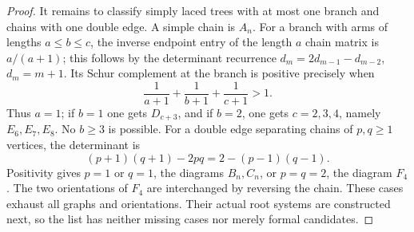 \begin{proof}
It remains to classify simply laced trees with at most
one branch and chains with one double edge.
A simple chain is \(A_n\).
For a branch with arms of lengths \(a\le b\le c\),
the inverse endpoint entry of the length \(a\) chain
matrix is \(a/(a+1)\); this follows by the determinant
recurrence \(d_m=2d_{m-1}-d_{m-2}\), \(d_m=m+1\).
Its Schur complement at the branch is positive precisely when
\[
 \frac1{a+1}+\frac1{b+1}+\frac1{c+1}>1.
\]
Thus \(a=1\); if \(b=1\) one gets \(D_{c+3}\), and if
\(b=2\), one gets \(c=2,3,4\), namely \(E_6,E_7,E_8\).
No \(b\ge3\) is possible.
For a double edge separating chains of \(p,q\ge1\) vertices,
the determinant is
\[
 (p+1)(q+1)-2pq=2-(p-1)(q-1).
\]
Positivity gives \(p=1\) or \(q=1\), the diagrams \(B_n,C_n\),
or \(p=q=2\), the diagram \(F_4\).
The two orientations of \(F_4\) are interchanged by reversing
the chain. These cases exhaust all graphs and orientations.
Their actual root systems are constructed next, so the list
has neither missing cases nor merely formal candidates.
\end{proof}

